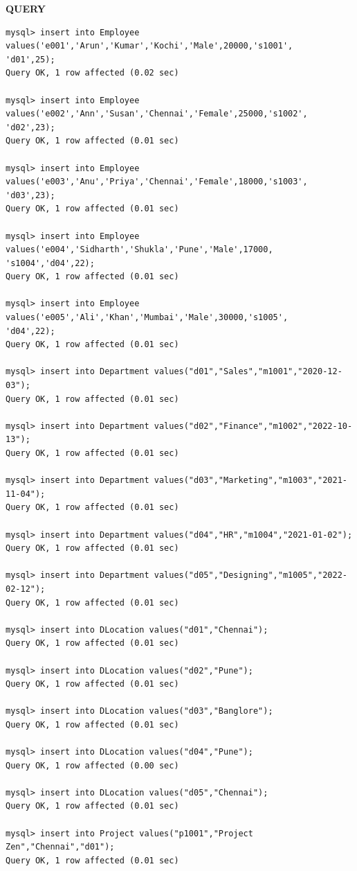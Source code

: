 \documentclass[a4paper,12pt]{report}
\begin{document}
	\begin{flushleft}
		\textbf{QUERY }
	\end{flushleft}
\begin{verbatim}
mysql> insert into Employee values('e001','Arun','Kumar','Kochi','Male',20000,'s1001',
'd01',25);
Query OK, 1 row affected (0.02 sec)

mysql> insert into Employee values('e002','Ann','Susan','Chennai','Female',25000,'s1002',
'd02',23);
Query OK, 1 row affected (0.01 sec)

mysql> insert into Employee values('e003','Anu','Priya','Chennai','Female',18000,'s1003',
'd03',23);
Query OK, 1 row affected (0.01 sec)

mysql> insert into Employee values('e004','Sidharth','Shukla','Pune','Male',17000,
's1004','d04',22);
Query OK, 1 row affected (0.01 sec)

mysql> insert into Employee values('e005','Ali','Khan','Mumbai','Male',30000,'s1005',
'd04',22);
Query OK, 1 row affected (0.01 sec)

mysql> insert into Department values("d01","Sales","m1001","2020-12-03");
Query OK, 1 row affected (0.01 sec)

mysql> insert into Department values("d02","Finance","m1002","2022-10-13");
Query OK, 1 row affected (0.01 sec)

mysql> insert into Department values("d03","Marketing","m1003","2021-11-04");
Query OK, 1 row affected (0.01 sec)

mysql> insert into Department values("d04","HR","m1004","2021-01-02");
Query OK, 1 row affected (0.01 sec)

mysql> insert into Department values("d05","Designing","m1005","2022-02-12");
Query OK, 1 row affected (0.01 sec)

mysql> insert into DLocation values("d01","Chennai");
Query OK, 1 row affected (0.01 sec)

mysql> insert into DLocation values("d02","Pune");
Query OK, 1 row affected (0.01 sec)

mysql> insert into DLocation values("d03","Banglore");
Query OK, 1 row affected (0.01 sec)

mysql> insert into DLocation values("d04","Pune");
Query OK, 1 row affected (0.00 sec)

mysql> insert into DLocation values("d05","Chennai");
Query OK, 1 row affected (0.01 sec)

mysql> insert into Project values("p1001","Project Zen","Chennai","d01");
Query OK, 1 row affected (0.01 sec)


\end{verbatim}
\end{document}
